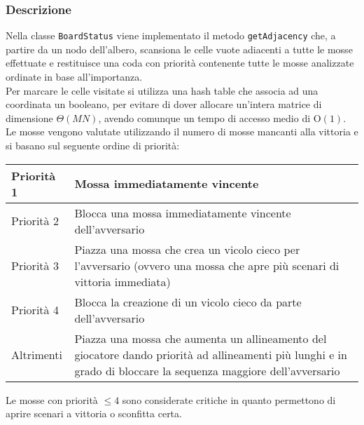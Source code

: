 \documentclass[11pt]{article}
\begin{document}
\subsubsection*{Descrizione}
Nella classe \texttt{BoardStatus} viene implementato il metodo \texttt{getAdjacency} che, a partire da un nodo dell'albero, scansiona le celle vuote adiacenti a tutte le mosse effettuate e restituisce una coda con priorità contenente tutte le mosse analizzate ordinate in base all'importanza.\\
Per marcare le celle visitate si utilizza una hash table che associa ad una coordinata un booleano, per evitare di dover allocare un'intera matrice di dimensione $\Theta(MN)$, avendo comunque un tempo di accesso medio di O$(1)$.\\
Le mosse vengono valutate utilizzando il numero di mosse mancanti alla vittoria e si basano sul seguente ordine di priorità:
\begin{table}[H]	%
\centering			%
\def\arraystretch{1.5}
\begin{tabular}{|l|p{4in}|}	%
\hline	%
Priorità 1 & Mossa immediatamente vincente \\ \hline
Priorità 2 & Blocca una mossa immediatamente vincente dell'avversario \\ \hline
Priorità 3 & Piazza una mossa che crea un vicolo cieco per l'avversario (ovvero una mossa che apre più scenari di vittoria immediata) \\ \hline
Priorità 4 & Blocca la creazione di un vicolo cieco da parte dell'avversario \\ \hline
Altrimenti & Piazza una mossa che aumenta un allineamento del giocatore dando priorità ad allineamenti più lunghi e in grado di bloccare la sequenza maggiore dell'avversario \\ \hline
\end{tabular}
\end{table}
$ $\\
Le mosse con priorità $\leq 4$ sono considerate critiche in quanto permettono di aprire scenari a vittoria o sconfitta certa.
\end{document}
